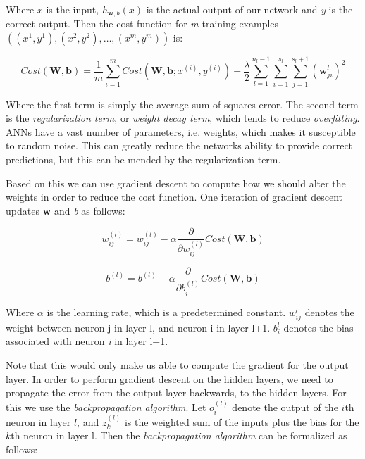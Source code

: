Where $ x $ is the input, $ h_{\mathbf{w},b}(x) $ is the actual output of our network and \textit{y} is the correct output.
Then the cost function for \textit{m} training examples $ ((x^{1}, y^{1}), (x^{2}, y^{2}), \dots, (x^{m}, y^{m})) $ is:

\begin{equation}
	Cost(\mathbf{W},\mathbf{b}) = \frac{1}{m}\sum_{i=1}^{m}Cost(\mathbf{W},\mathbf{b};x^{(i)},y^{(i)}) + \frac{\lambda}{2}
	\sum_{l=1}^{n_l-1}\sum_{i=1}^{s_l}\sum_{j=1}^{s_l+1}
	(\mathbf{w}_{ji}^{l})^2
\end{equation}
 
Where the first term is simply the average sum-of-squares error. The second term is the \textit{regularization term}, or \textit{weight decay term}, which tends to reduce \textit{overfitting}. ANNs have a vast number of parameters, i.e. weights, which makes it susceptible to random noise. This can greatly reduce the networks ability to provide correct predictions, but this  can be mended by the regularization term. 

Based on this we can use gradient descent to compute how we should alter the weights in order to reduce the cost function. One iteration of gradient descent updates \textbf{w} and \textit{b} as follows:

\begin{equation}
	w_{ij}^{(l)} = w_{ij}^{(l)} - \alpha\frac{\partial}{\partial w_{ij}^{(l)} }Cost(\mathbf{W},\mathbf{b})
\end{equation}

\begin{equation}
	b^{(l)} = b^{(l)} - \alpha\frac{\partial}{\partial b_{i}^{(l)} }Cost(\mathbf{W},\mathbf{b})
\end{equation}

Where $ \alpha $ is the learning rate, which is a predetermined constant. $ w_{ij}^l $ denotes the weight between neuron j in layer l, and neuron i in layer l+1. $ b_i^l $ denotes the bias associated with neuron \textit{i} in layer l+1. 

Note that this would only make us able to compute the gradient for the output layer. In order to perform gradient descent on the hidden layers, we need to propagate the error from the output layer backwards, to the hidden layers. For this we use the \textit{backpropagation algorithm}. Let $ o_i^{(l)} $ denote the output of the $i$th neuron in layer $l$, and $z_k^{(l)}$ is the weighted sum of the inputs plus the bias for the $k$th neuron in layer l. Then the \textit{backpropagation algorithm} can be formalized as follows: 

